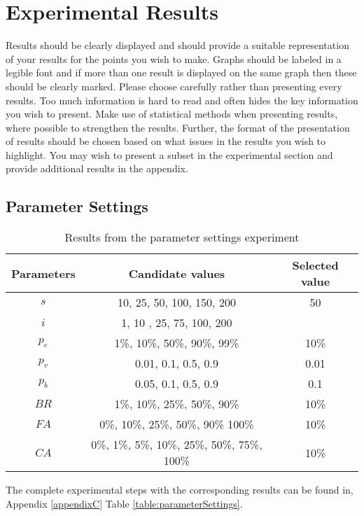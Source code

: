 \section{Experimental Results}

Results should be clearly displayed and should provide a suitable representation of your results for the points you wish to make. Graphs should be labeled in a legible font and if more than one result is displayed on the same graph then these should be clearly marked.   Please choose carefully rather than presenting every results. Too much information is hard to read and often hides the key information you wish to present. Make use of statistical methods when presenting results, where possible to strengthen the results.  Further, the format of the presentation of results should be chosen based on what issues in the results you wish to highlight. You may wish to present a subset in the experimental section and provide additional results in the appendix.

\subsection{Parameter Settings}
\label{subsec:parameterSettings_results}

	\begin{table}[H]
	\centering
    \begin{tabular}{|c|c||c|}
 	\hline
 	Parameters & Candidate values & Selected value\\
 	\hline
    $s$ & 10, 25, 50, 100, 150, 200 & 50 \\
    $i$ & 1, 10 , 25, 75, 100, 200 & ~ \\
    $p_{e}$ & 1\%, 10\%, 50\%, 90\%, 99\% & 10\% \\
    $p_{v}$ & 0.01, 0.1, 0.5, 0.9 & 0.01  \\
    $p_{b}$ & 0.05, 0.1, 0.5, 0.9 & 0.1 \\
    $BR$ & 1\%, 10\%, 25\%, 50\%, 90\% & 10\% \\
    $FA$ & 0\%, 10\%, 25\%, 50\%, 90\% 100\% & 10\% \\
    $CA$ & 0\%, 1\%, 5\%, 10\%, 25\%, 50\%, 75\%, 100\% & 10\% \\
	\hline
    \end{tabular}
    \caption {Results from the parameter settings experiment}
    The complete experimental steps with the corresponding results can be found in, Appendix \ref{appendixC} Table \vref{table:parameterSettings}.
    \label{table:parameterSettings2}
	\end{table}

